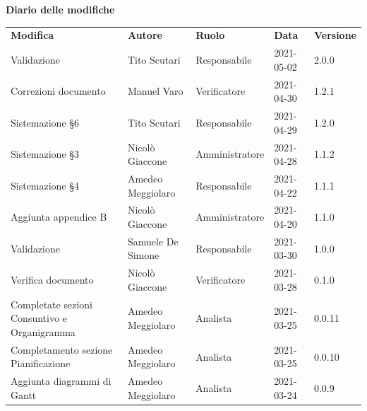 \documentclass[a4paper]{article}
\begin{document}
\begin{center}
    \textbf{\Large Diario delle modifiche}\\
    \vspace{10px}
    \begin{table}[h!]
        \centering
        \renewcommand{\arraystretch}{1.8}
        \begin{tabular}{p{150px} p{90px} p{80px} p{60px} p{45px}}
            \rowcolor{logo!70} \textbf{Modifica}                          & \textbf{Autore}   & \textbf{Ruolo} & \textbf{Data} & \textbf{Versione} \\
            Validazione                                                   & Tito Scutari      & Responsabile   & 2021-05-02    & 2.0.0             \\
            Correzioni documento                                          & Manuel Varo       & Verificatore   & 2021-04-30    & 1.2.1             \\
            Sistemazione \S 6                                             & Tito Scutari      & Responsabile   & 2021-04-29    & 1.2.0             \\
            Sistemazione \S 3                                             & Nicolò Giaccone   & Amministratore & 2021-04-28    & 1.1.2             \\
            Sistemazione \S 4                                             & Amedeo Meggiolaro & Responsabile   & 2021-04-22    & 1.1.1             \\
            Aggiunta appendice B                                          & Nicolò Giaccone   & Amministratore & 2021-04-20    & 1.1.0             \\
            Validazione                                                   & Samuele De Simone & Responsabile   & 2021-03-30    & 1.0.0             \\
            Verifica documento                                            & Nicolò Giaccone   & Verificatore   & 2021-03-28    & 0.1.0             \\
            Completate sezioni Consuntivo e Organigramma                  & Amedeo Meggiolaro & Analista       & 2021-03-25    & 0.0.11            \\
            Completamento sezione Pianificazione                          & Amedeo Meggiolaro & Analista       & 2021-03-25    & 0.0.10            \\
            Aggiunta diagrammi di Gantt                                   & Amedeo Meggiolaro & Analista       & 2021-03-24    & 0.0.9             \\

\end{tabular}
\end{table}
\end{center}
\end{document}
